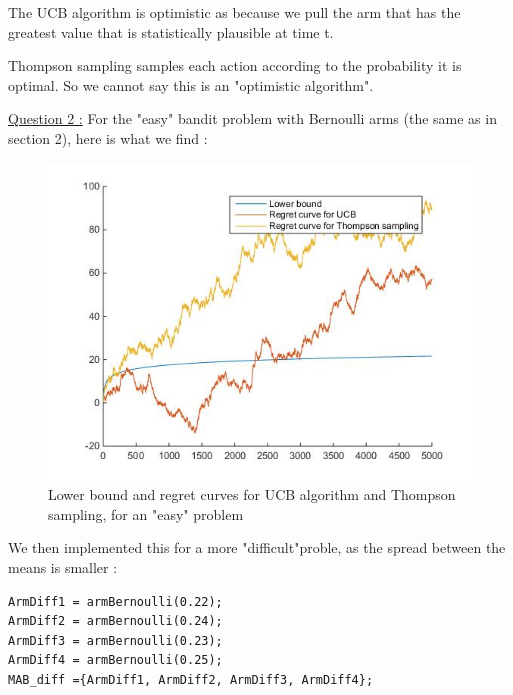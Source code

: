 \documentclass[11pt,a4paper]{article}
\begin{document}
The UCB algorithm is optimistic as because we pull the arm that has the greatest value that is statistically plausible at time t.

Thompson sampling samples each action according to the probability it is optimal. So we cannot say this is an "optimistic algorithm".

\underline{Question 2 :} For the "easy" bandit problem with Bernoulli arms (the same as in section 2), here is what we find :

\begin{figure}[H]
	\centering
	\noindent\includegraphics[scale=0.4]{regret_thom_easy.jpg}
	\caption{Lower bound and regret curves for UCB algorithm and Thompson sampling, for an "easy" problem}
\end{figure}

We then implemented this for a more "difficult"proble, as the spread between the means is smaller :
\begin{verbatim}
ArmDiff1 = armBernoulli(0.22);
ArmDiff2 = armBernoulli(0.24);
ArmDiff3 = armBernoulli(0.23);
ArmDiff4 = armBernoulli(0.25);
MAB_diff ={ArmDiff1, ArmDiff2, ArmDiff3, ArmDiff4};
\end{verbatim}
\end{document}
